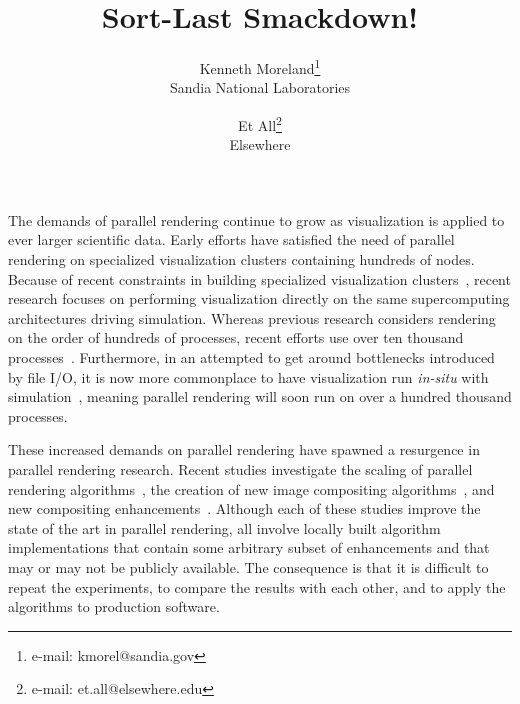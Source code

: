 \documentclass{vgtc}                          %
\title{Sort-Last Smackdown!}
\author{ %
  Kenneth Moreland\thanks{e-mail: kmorel@sandia.gov} \\ %
    \scriptsize Sandia National Laboratories %
  \and Et All\thanks{e-mail: et.all@elsewhere.edu} \\ %
    \scriptsize Elsewhere %
}
\newcommand*{\lcite}[1]{~\cite{#1}}
\begin{document}


\maketitle

\label{sec:Introduction}

The demands of parallel rendering continue to grow as visualization is
applied to ever larger scientific data.  Early efforts have satisfied the
need of parallel rendering on specialized visualization clusters containing
hundreds of nodes.  Because of recent constraints in building specialized
visualization clusters\lcite{Childs2007}, recent research focuses on
performing visualization directly on the same supercomputing architectures
driving simulation.  Whereas previous research considers rendering on the
order of hundreds of processes, recent efforts use over ten thousand
processes\lcite{Childs2010}.  Furthermore, in an attempted to get around
bottlenecks introduced by file I/O, it is now more commonplace to have
visualization run \emph{in-situ} with
simulation\lcite{Ma2009:SciDACReview,Ma2009:CG&A,Yu2010,Tu2006}, meaning
parallel rendering will soon run on over a hundred thousand processes.

These increased demands on parallel rendering have spawned a resurgence in
parallel rendering research.  Recent studies investigate the scaling of
parallel rendering algorithms\lcite{Peterka2009}, the creation of new image
compositing algorithms\lcite{23Swap,RadixK}, and new compositing
enhancements\lcite{Kendall2010}.  Although each of these studies improve
the state of the art in parallel rendering, all involve locally built
algorithm implementations that contain some arbitrary subset of
enhancements and that may or may not be publicly available.  The
consequence is that it is difficult to repeat the experiments, to compare
the results with each other, and to apply the algorithms to production
software.
\end{document}
